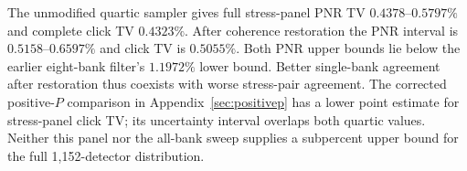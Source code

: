 \documentclass[11pt]{article}
\begin{document}
The unmodified quartic sampler gives full stress-panel PNR TV $0.4378$--$0.5797\%$ and complete click TV $0.4323\%$. After coherence restoration the PNR interval is $0.5158$--$0.6597\%$ and click TV is $0.5055\%$. Both PNR upper bounds lie below the earlier eight-bank filter's $1.1972\%$ lower bound. Better single-bank agreement after restoration thus coexists with worse stress-pair agreement. The corrected positive-$P$ comparison in Appendix~\ref{sec:positivep} has a lower point estimate for stress-panel click TV; its uncertainty interval overlaps both quartic values. Neither this panel nor the all-bank sweep supplies a subpercent upper bound for the full 1,152-detector distribution.
\end{document}
